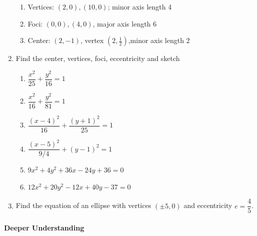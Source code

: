 \documentclass[11pt]{article}
\begin{document}
\begin{enumerate}
\begin{enumerate}
  \item
    Vertices: \((2,0), (10,0)\); minor axis length 4
  \item
    Foci: \((0,0), (4,0)\), major axis length 6
  \item
    Center: \((2,-1)\), vertex \((2,\frac12)\),minor axis length 2
  \end{enumerate}
\item
  Find the center, vertices, foci, eccentricity and sketch

  \begin{enumerate}

  \item
    \(\dfrac{x^2}{25} + \dfrac{y^2}{16} = 1\)
  \item
    \(\dfrac{x^2}{16} + \dfrac{y^2}{81} = 1\)
  \item
    \(\dfrac{(x-4)^2}{16} + \dfrac{(y+1)^2}{25} = 1\)
  \item
    \(\dfrac{(x-5)^2}{9/4} + (y-1)^2 = 1\)
  \item
    \(9x^2 + 4y^2 + 36x - 24y + 36 = 0\)
  \item
    \(12x^2 + 20y^2 - 12x + 40y - 37 = 0\)
  \end{enumerate}
\item
  Find the equation of an ellipse with vertices \((\pm 5,0)\) and
  eccentricity \(e = \dfrac{4}{5}\).

\end{enumerate}

\hypertarget{deeper-understanding}{%
\paragraph{Deeper Understanding}\label{deeper-understanding}}
\end{document}
